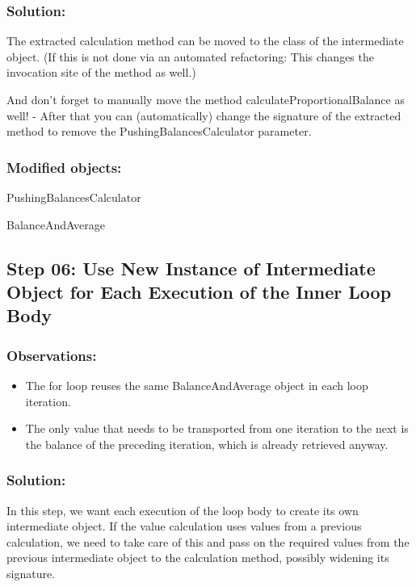 \documentclass[a4paper,fleqn,titlepage,11pt]{article}
\begin{document}
\subsubsection*{Solution:}

The extracted calculation method can be moved to the class of the intermediate object. (If this is not done via an automated refactoring: This changes the invocation site of the method as well.)

And don't forget to manually move the method calculateProportionalBalance as well! - After that you can (automatically) change the signature of the extracted method to remove the PushingBalancesCalculator parameter.

\subsubsection*{Modified objects:}

PushingBalancesCalculator

BalanceAndAverage


\subsection*{Step 06: Use New Instance of Intermediate Object for Each Execution of the Inner Loop Body}

\subsubsection*{Observations:}
\begin{itemize}
\item The for loop reuses the same BalanceAndAverage object in each loop iteration.
\item The only value that needs to be transported from one iteration to the next is the balance of the preceding iteration, which is already retrieved anyway.
\end{itemize}

\subsubsection*{Solution:}


In this step, we want each execution of the loop body to create its own intermediate object. If the value calculation uses values from a previous calculation, we need to take care of this and pass on the required values from the previous intermediate object to the calculation method, possibly widening its signature.
\end{document}
